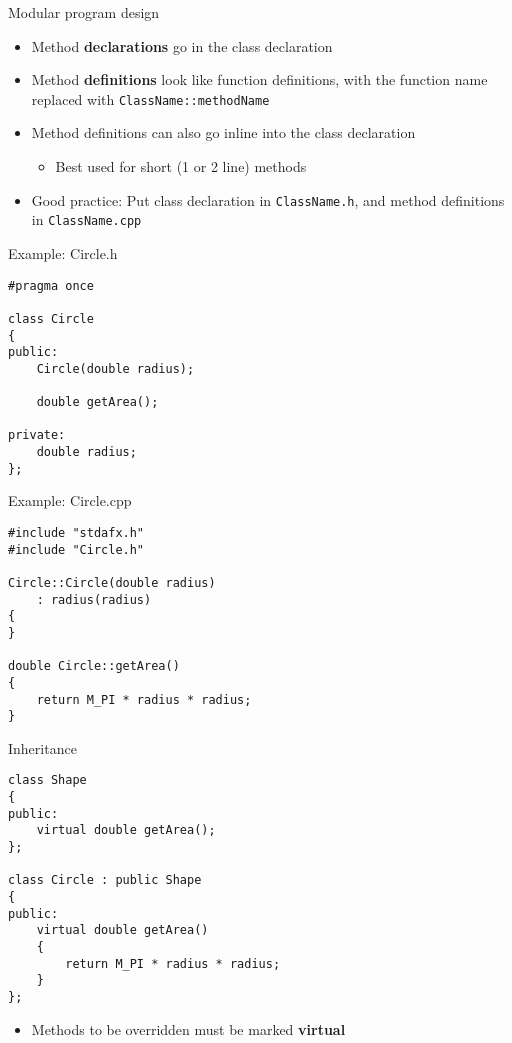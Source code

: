 \begin{frame}[fragile]{Modular program design}
    \begin{itemize}
        \item Method \textbf{declarations} go in the class declaration \pause
        \item Method \textbf{definitions} look like function definitions,
            with the function name replaced with \lstinline{ClassName::methodName} \pause
        \item Method definitions can also go inline into the class declaration
        \begin{itemize}
            \item Best used for short (1 or 2 line) methods
        \end{itemize}
        \pause
        \item Good practice: Put class declaration in \texttt{ClassName.h}, and method definitions in \texttt{ClassName.cpp}
    \end{itemize}
\end{frame}

\begin{frame}[fragile]{Example: Circle.h}
    \begin{lstlisting}
#pragma once

class Circle
{
public:
    Circle(double radius);
    
    double getArea();

private:
    double radius;
};
    \end{lstlisting}
\end{frame}

\begin{frame}[fragile]{Example: Circle.cpp}
    \begin{lstlisting}
#include "stdafx.h"
#include "Circle.h"

Circle::Circle(double radius)
    : radius(radius)
{
}

double Circle::getArea()
{
    return M_PI * radius * radius;
}
    \end{lstlisting}
\end{frame}

\begin{frame}[fragile]{Inheritance}
    \begin{lstlisting}
class Shape
{
public:
    virtual double getArea();
};

class Circle : public Shape
{
public:
    virtual double getArea()
    {
        return M_PI * radius * radius;
    }
};
    \end{lstlisting}
    \pause
    \begin{itemize}
        \item Methods to be overridden must be marked \textbf{virtual}
    \end{itemize}
\end{frame}

